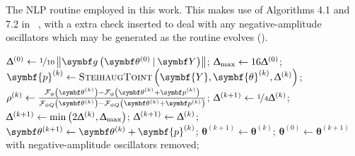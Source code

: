 \begin{algorithm}
    \caption[
        The \acl{NLP} routine employed in this work.
    ]
    {
        The \acs{NLP} routine employed in this work. This makes use of
        Algorithms 4.1 and 7.2 in ~\cite{Nocedal2006}, with a extra check
        inserted to deal with any negative-amplitude oscillators which may be
        generated as the routine evolves
        ().
    }
    \label{alg:nlp}
    \begin{algorithmic}[1]
            \State $\trustradius{0} \gets \nicefrac{1}{10} \left\lVert \bdgthzeroY \right\rVert$;
            \State $\Updelta_{\text{max}} \gets 16 \Updelta^{(0)}$;
            \State $\symbf{p}^{(k)} \gets \textsc{SteihaugToint}\left(\symbf{Y}, \symbf{\theta}^{(k)}, \trustradius{k}\right)$;
                \State $\rho^{(k)} \gets
                    \frac
                        {\Fphithk - \Fphithkpk}
                        {\FphiQthk - \FphiQthkpk}$;
                \label{state:decrease-tr-start}
                \State $\Updelta^{(k+1)} \gets \nicefrac{1}{4} \Updelta^{(k)}$;
                    \label{state:decrease-tr-end}
                \label{state:increase-tr-start}
                \State $\Updelta^{(k+1)} \gets \min\left(2 \Updelta^{(k)}, \Updelta_{\text{max}}\right)$;
                    \label{state:increase-tr-end}
                \Else
                \State $\Updelta^{(k+1)} \gets \Updelta^{(k)}$;
                \EndIf
                \label{state:large-rho-start}
                    \State $\bthkplusone \gets \bthk + \symbf{p}^{(k)}$;
                    \label{state:large-rho-end}
                \Else
                \label{state:small-rho-start}
                    \State $\symbf{\theta}^{(k+1)} \gets \symbf{\theta}^{(k)}$;
                    \label{state:small-rho-end}
                \EndIf
                \label{state:neg-amp-start}
                    \State $\symbf{\theta}^{(0)} \gets \symbf{\theta}^{(k+1)}$ with negative-amplitude oscillators removed;

\end{algorithmic}
\end{algorithm}
